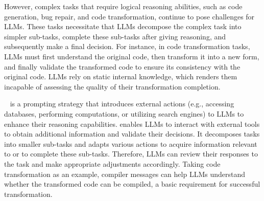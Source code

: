 However, complex tasks that require logical reasoning abilities, such as code generation, bug repair, and code transformation, continue to pose challenges for LLMs. 
These tasks necessitate that LLMs decompose the complex task into simpler sub-tasks, complete these sub-tasks after giving reasoning, and subsequently make a final decision. 
For instance, in code transformation tasks, LLMs must first understand the original code, then transform it into a new form, and finally validate the transformed code to ensure its consistency with the original code.
LLMs rely on static internal knowledge, which renders them incapable of assessing the quality of their transformation completion.

~\cite{yaoZYDSN023} is a prompting strategy that introduces external actions (e.g., accessing databases, performing computations, or utilizing search engines) to LLMs to enhance their reasoning capabilities.
 enables LLMs to interact with external tools to obtain additional information and validate their decisions.
It decomposes tasks into smaller sub-tasks and adapts various actions to acquire information relevant to or to complete these sub-tasks.
Therefore, LLMs can review their responses to the task and make appropriate adjustments accordingly.
Taking code transformation as an example, compiler messages can help LLMs understand whether the transformed code can be compiled, a basic requirement for successful transformation.

